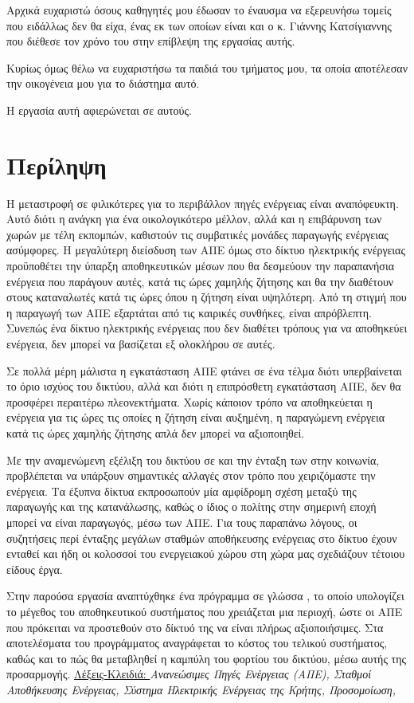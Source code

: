 \documentclass[12pt]{report}
\begin{document}
Αρχικά ευχαριστώ όσους καθηγητές μου έδωσαν το έναυσμα να εξερευνήσω τομείς που ειδάλλως δεν θα είχα, ένας εκ των οποίων είναι και ο κ. Γιάννης Κατσίγιαννης που διέθεσε τον χρόνο του στην επίβλεψη της εργασίας αυτής.

Κυρίως όμως θέλω να ευχαριστήσω τα παιδιά του τμήματος μου, τα οποία αποτέλεσαν την οικογένεια μου για το διάστημα αυτό. 

Η εργασία αυτή αφιερώνεται σε αυτούς.
\chapter*{Περίληψη}
Η μεταστροφή σε φιλικότερες για το περιβάλλον πηγές ενέργειας είναι αναπόφευκτη. Αυτό διότι η ανάγκη για ένα οικολογικότερο μέλλον, αλλά και η επιβάρυνση των χωρών με τέλη εκπομπών, καθιστούν τις συμβατικές μονάδες 
παραγωγής ενέργειας ασύμφορες. Η μεγαλύτερη διείσδυση των ΑΠΕ όμως στο δίκτυο ηλεκτρικής ενέργειας προϋποθέτει την ύπαρξη αποθηκευτικών μέσων που θα δεσμεύουν την παραπανήσια ενέργεια που παράγουν αυτές, κατά τις ώρες χαμηλής 
ζήτησης και θα την διαθέτουν στους καταναλωτές κατά τις ώρες όπου η ζήτηση είναι υψηλότερη. Από τη στιγμή που η παραγωγή των ΑΠΕ εξαρτάται από τις καιρικές συνθήκες, είναι απρόβλεπτη. Συνεπώς ένα δίκτυο ηλεκτρικής ενέργειας 
που δεν διαθέτει τρόπους για να αποθηκεύει ενέργεια, δεν μπορεί να βασίζεται εξ ολοκλήρου σε αυτές.

Σε πολλά μέρη μάλιστα η εγκατάσταση ΑΠΕ φτάνει σε ένα τέλμα διότι υπερβαίνεται το όριο ισχύος του δικτύου, αλλά και διότι η επιπρόσθετη εγκατάσταση ΑΠΕ, δεν θα προσφέρει περαιτέρω πλεονεκτήματα. Χωρίς κάποιον τρόπο να αποθηκεύεται
η ενέργεια για τις ώρες τις οποίες η ζήτηση είναι αυξημένη, η παραγώμενη ενέργεια κατά τις ώρες χαμηλής ζήτησης απλά δεν μπορεί να αξιοποιηθεί. 

Με την αναμενώμενη εξέλιξη του δικτύου σε {} και την ένταξη των {} στην κοινωνία, προβλέπεται να υπάρξουν σημαντικές αλλαγές στον τρόπο που χειριζόμαστε την ενέργεια. Τα έξυπνα δίκτυα 
εκπροσωπούν μία αμφίδρομη σχέση μεταξύ της παραγωγής και της κατανάλωσης, καθώς ο ίδιος ο πολίτης στην σημερινή εποχή μπορεί να είναι παραγωγός, μέσω των ΑΠΕ. Για τους παραπάνω λόγους, οι συζητήσεις περί ένταξης μεγάλων σταθμών 
αποθήκευσης ενέργειας στο δίκτυο έχουν ενταθεί και ήδη οι κολοσσοί του ενεργειακού χώρου στη χώρα μας σχεδιάζουν τέτοιου είδους έργα. 

Στην παρούσα εργασία αναπτύχθηκε ένα πρόγραμμα σε γλώσσα {}, το οποίο υπολογίζει το μέγεθος του αποθηκευτικού συστήματος που χρειάζεται μια περιοχή, ώστε οι ΑΠΕ που πρόκειται να προστεθούν στο δίκτυό της να είναι
πλήρως αξιοποιήσιμες. Στα αποτελέσματα του προγράμματος αναγράφεται το κόστος του τελικού συστήματος, καθώς και το πώς θα μεταβληθεί η καμπύλη του φορτίου του δικτύου, μέσω αυτής της προσαρμογής.
\vfill
{\underline{Λέξεις-Κλειδιά: }}{\textit{Ανανεώσιμες Πηγές Ενέργειας (ΑΠΕ), Σταθμοί Αποθήκευσης Ενέργειας, Σύστημα Ηλεκτρικής Ενέργειας της Κρήτης, Προσομοίωση, {}}}
\end{document}
